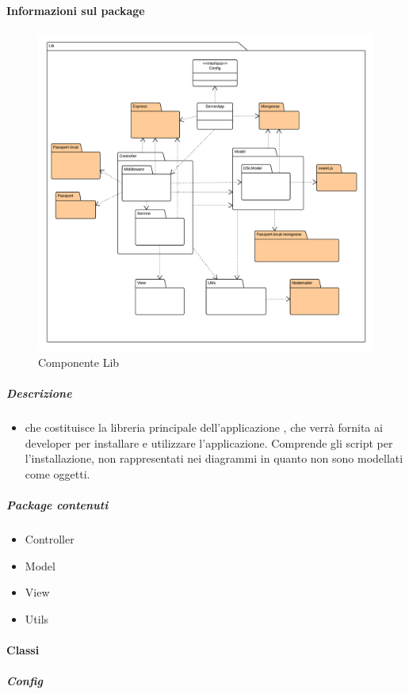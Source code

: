 	\paragraph{Informazioni sul package} 
		\begin{figure}[H] 
			\begin{center} 
				\includegraphics[width=\textwidth]{uml/package/Back-end::Lib.png}  
				\caption{Componente Lib}
			\end{center}  
		\end{figure} 
	\subparagraph{Descrizione} 
		\begin{itemize}
		\item[]  che costituisce la libreria principale dell’applicazione , che verrà fornita ai
developer per installare e utilizzare l’applicazione. Comprende gli script per l’installazione,
non rappresentati nei diagrammi in quanto non sono modellati come oggetti.

		\end{itemize} 
		\subparagraph{Package contenuti} 
		\begin{itemize}
				\item Controller
				\item Model
				\item View
				\item Utils
		\end{itemize}
		\paragraph{Classi}
			\subparagraph{Config}
				
